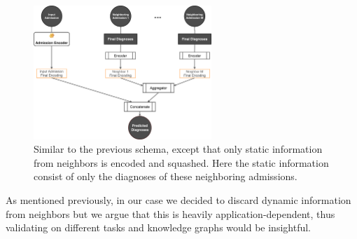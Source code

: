 \begin{figure}[H]
 \centering
 \includegraphics[width=0.6\textwidth]{figures/kg-rnn-healthcare.pdf}
 \caption{Similar to the previous schema, except that only static information from neighbors is encoded and squashed. Here the static information consist of only the diagnoses of these neighboring admissions.}
 \label{fig:kg-rnn-healthcare}
\end{figure}

As mentioned previously, in our case we decided to discard dynamic information from neighbors but we argue that this is heavily application-dependent, thus validating on different tasks and knowledge graphs would be insightful.